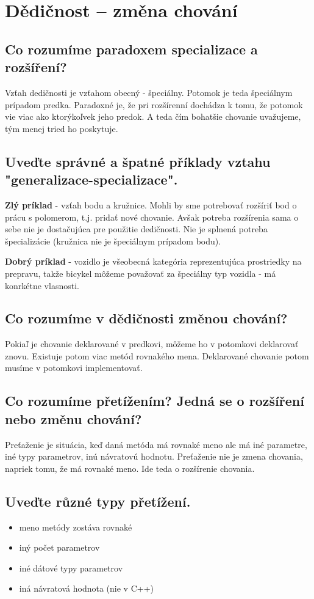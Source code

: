 \section{Dědičnost – změna chování}
\subsection{Co rozumíme paradoxem specializace a rozšíření?}
Vzťah dedičnosti je vzťahom obecný - špeciálny. Potomok je teda špeciálnym prípadom predka. Paradoxné je, že pri rozšírenní dochádza k tomu, že potomok vie viac ako ktorýkoľvek jeho predok.
A teda čím bohatšie chovanie uvažujeme, tým menej tried ho poskytuje.

\subsection{Uveďte správné a špatné příklady vztahu "generalizace-specializace".}
\textbf{Zlý príklad} - vzťah bodu a kružnice. Mohli by sme potrebovať rozšíriť bod o prácu s polomerom, t.j. pridať nové chovanie. Avšak potreba rozšírenia sama o sebe nie je dostačujúca pre použitie dedičnosti. Nie je splnená potreba špecializácie (kružnica nie je špeciálnym prípadom bodu).

\textbf{Dobrý príklad} - vozidlo je všeobecná kategória reprezentujúca prostriedky na prepravu, takže bicykel môžeme považovať za špeciálny typ vozidla - má konrkétne vlasnosti.

\subsection{Co rozumíme v dědičnosti změnou chování?}
Pokiaľ je chovanie deklarované v predkovi, môžeme ho v potomkovi deklarovať znovu. Existuje potom viac metód rovnakého mena. Deklarované chovanie potom musíme v potomkovi implementovať.

\subsection{Co rozumíme přetížením? Jedná se o rozšíření nebo změnu chování?}
Preťaženie je situácia, keď daná metóda má rovnaké meno ale má iné parametre, iné typy parametrov, inú návratovú hodnotu. Preťaženie nie je zmena chovania, napriek tomu, že má rovnaké meno. Ide teda o rozšírenie chovania.

\subsection{Uveďte různé typy přetížení.}
\begin{itemize}
    \item meno metódy zostáva rovnaké
    \item iný počet parametrov
    \item iné dátové typy parametrov
    \item iná návratová hodnota (nie v C++)
\end{itemize}

